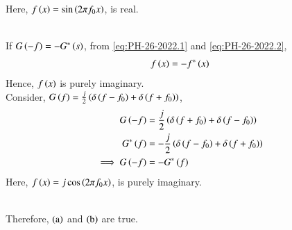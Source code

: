\documentclass[journal,12pt,twocolumn]{IEEEtran}
\theoremstyle{remark}
\begin{document}
Here, $f\left(x\right) = \sin \left(2 \pi f_0 x\right)$, is real.\\
\begin{figure}[h!]
    \centering
    
    \label{fig:PH-26-2022.1}
\end{figure}\\
If $G\left(-f\right) = - G^*\left(s\right)$, from \eqref{eq:PH-26-2022.1} and \eqref{eq:PH-26-2022.2},
\begin{align}
    f\left(x\right) = -f^*\left(x\right)
\end{align}
Hence, $f\left(x\right)$ is purely imaginary. \\
Consider, $G\left(f\right) = \frac{j}{2} \left( \delta\left( f - f_0 \right) + \delta\left( f + f_0\right) \right) $,
\begin{align}
    G\left(-f\right) &= \frac{j}{2} \left( \delta\left( f + f_0 \right) + \delta\left( f - f_0\right) \right) \\
    G^*\left(f\right) &= -\frac{j}{2} \left( \delta\left( f - f_0 \right) + \delta\left( f + f_0\right) \right) \\
    \implies G\left(-f\right) &= -G^*\left(f\right)
\end{align}
Here, $f\left(x\right) = j \cos\left(2 \pi f_0 x\right)$, is purely imaginary.
\begin{figure}[h!]
    \centering
    
    \label{fig:PH-26-2022.2}
\end{figure}\\
Therefore, $\left(\text{a}\right)$ and $\left(\text{b}\right)$ are true.
\end{document}
